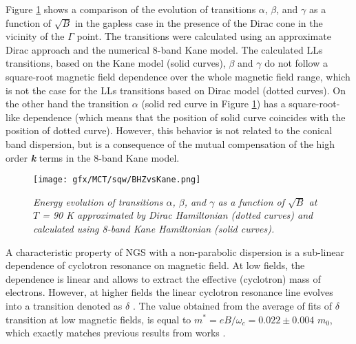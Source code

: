 \documentclass[titlepage,a4paper]{book}
\begin{document}
Figure \ref{fig:BHZvsKane} shows a comparison of the evolution of transitions $\alpha$, $\beta$, and $\gamma$ as a function of $\sqrt{B}$ in the gapless case in the presence of the Dirac cone in the vicinity of the $\Gamma$ point. The transitions were calculated using an approximate Dirac approach and the numerical 8-band Kane model. The calculated LLs transitions, based on the Kane model (solid curves), $\beta$ and $\gamma$ do not follow a square-root magnetic field dependence over the whole magnetic field range, which is not the case for the LLs transitions based on Dirac model (dotted curves). On the other hand the transition $\alpha$ (solid red curve in Figure \ref{fig:BHZvsKane}) has a square-root-like dependence (which means that the position of solid curve coincides with the position of dotted curve). However, this behavior is not related to the conical band dispersion, but is a consequence of the mutual compensation of the high order \textbf{\textit{k}} terms in the 8-band Kane model.  

\begin{figure}[ht]
	\centering
	\texttt{[image: gfx/MCT/sqw/BHZvsKane.png]}
	\vspace{-10pt}
	\caption{\textit{Energy evolution of transitions $\alpha$, $\beta$, and $\gamma$ as a function of $\sqrt{B}$ at $T$ = 90 K approximated by Dirac Hamiltonian (dotted curves) and calculated using 8-band Kane Hamiltonian (solid curves).}}
	\label{fig:BHZvsKane}
\end{figure}

A characteristic property of NGS with a non-parabolic dispersion is a sub-linear dependence of cyclotron resonance on magnetic field. At low fields, the dependence is linear and allows to extract the effective (cyclotron) mass of electrons. However, at higher fields the linear cyclotron resonance line evolves into a transition denoted as $\delta$ \cite{Orlita_MCT_QW}. The value obtained from the average of fits of $\delta$ transition at low magnetic fields, is equal to $m^* = eB/\omega_c = 0.022 \pm 0.004$ $m_0$, which exactly matches previous results from works \cite{Orlita_MCT_QW}\cite{Zholudev_MCT_QW}. 
\end{document}
